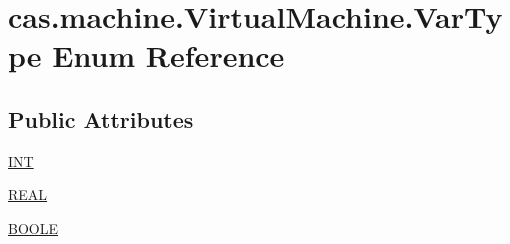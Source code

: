 \hypertarget{enumcas_1_1machine_1_1_virtual_machine_1_1_var_type}{\section{cas.\-machine.\-Virtual\-Machine.\-Var\-Type Enum Reference}
\label{enumcas_1_1machine_1_1_virtual_machine_1_1_var_type}
}
\subsection*{Public Attributes}
\begin{DoxyCompactItemize}
\item 
\hyperlink{enumcas_1_1machine_1_1_virtual_machine_1_1_var_type_a5d8d3d6bae08973794306dc86eaa60e4}{I\-N\-T}
\item 
\hyperlink{enumcas_1_1machine_1_1_virtual_machine_1_1_var_type_a31daa7c97eb5e17ff6d88702c2022739}{R\-E\-A\-L}
\item 
\hyperlink{enumcas_1_1machine_1_1_virtual_machine_1_1_var_type_a14d1551cc662f8f41c5d8756391cbc27}{B\-O\-O\-L\-E}
\end{DoxyCompactItemize}


